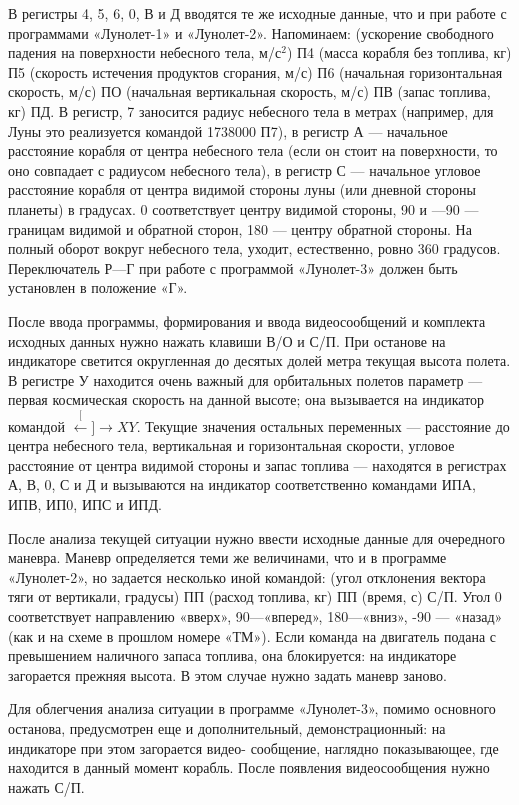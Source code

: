 \documentclass[11pt,a4paper,oneside]{article}
\def\XY{$\stackrel[\leftarrow]{\rightarrow}{XY}$}
\begin{document}
В регистры 4, 5, 6, 0, В и Д вводятся те же исходные данные, что и при работе с программами «Лунолет-1» и «Лунолет-2». Напоминаем: (ускорение свободного падения на поверхности небесного тела, м/с$^{2}$) П4 (масса корабля без топлива, кг) П5 (скорость истечения продуктов сгорания, м/с) П6 (начальная горизонтальная скорость, м/с) ПО (начальная вертикальная скорость, м/с) ПВ (запас топлива, кг) ПД. В регистр, 7 заносится радиус небесного тела в метрах (например, для Луны это реализуется командой 1738000 П7), в регистр А — начальное расстояние корабля от центра небесного тела (если он стоит на поверхности, то оно совпадает с радиусом небесного тела), в регистр С — начальное угловое расстояние корабля от центра видимой стороны луны (или дневной стороны планеты) в градусах. 0 соответствует центру видимой стороны, 90 и —90 — границам видимой и обратной сторон, 180 — центру обратной стороны. На полный оборот вокруг небесного тела, уходит, естественно, ровно 360 градусов. Переключатель Р—Г при работе с программой «Лунолет-3» должен быть установлен в положение «Г».

После ввода программы, формирования и ввода видеосообщений и комплекта исходных данных нужно нажать клавиши В/О и С/П. При останове на индикаторе светится округленная до десятых долей метра текущая высота полета. В регистре У находится очень важный для орбитальных полетов параметр — первая космическая скорость на данной высоте; она вызывается на индикатор командой \XY. Текущие значения остальных переменных — расстояние до центра небесного тела, вертикальная и горизонтальная скорости, угловое расстояние от центра видимой стороны и запас топлива — находятся в регистрах А, В, 0, С и Д и вызываются на индикатор соответственно командами ИПА, ИПВ, ИП0, ИПС и ИПД.

После анализа текущей ситуации нужно ввести исходные данные для очередного маневра. Маневр определяется теми же величинами, что и в программе «Лунолет-2», но задается несколько иной командой: (угол отклонения вектора тяги от вертикали, градусы) ПП (расход топлива, кг) ПП (время, с) С/П. Угол 0 соответствует направлению «вверх», 90—«вперед», 180—«вниз», -90 — «назад» (как и на схеме в прошлом номере «ТМ»). Если команда на двигатель подана с превышением наличного запаса топлива, она блокируется: на индикаторе загорается прежняя высота. В этом случае нужно задать маневр заново.

Для облегчения анализа ситуации в программе «Лунолет-3», помимо основного останова, предусмотрен еще и дополнительный, демонстрационный: на индикаторе при этом загорается видео- сообщение, наглядно показывающее, где находится в данный момент корабль. После появления видеосообщения нужно нажать С/П.
\end{document}
